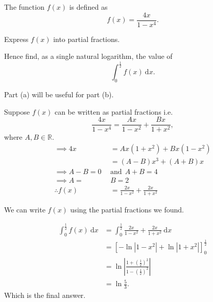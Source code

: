 
\begin{question}
    The function \(f(x) \) is defined as \[ f(x) = \frac{4x}{1 - x^4}. \]

    \begin{questionparts}
        \item Express \(f(x) \) into partial fractions. 
        \item Hence find, as a single natural logarithm, the value of \[ \int_{0}^{\frac{1}{2}} f(x)~ \mathrm{d } x. \]
    \end{questionparts}
    
\end{question}

\begin{solution}
    Part (a) will be useful for part (b). 

    \begin{solutionparts}
        \item Suppose \(f(x) \) can be written as partial fractions i.e. 
        \[ \frac{4x}{1-x^4} = \frac{Ax }{1 -x^2} + \frac{Bx }{1 + x^2},  \] where \(A, B \in \mathbb{R }\). 
        \begin{align*}
            \implies 4x &= Ax(1+x^2) + Bx(1-x^2) \\
            &= (A-B)x^3 + (A+B)x \\
            \implies A - B = 0 ~~&\text{and}~~ A+B = 4 \\
            \implies A = ~&B = 2 \\
            \therefore f(x) &= \frac{2x}{1 - x^2} + \frac{2x}{1 + x^2}
        \end{align*}

        \item We can write \(f(x) \) using the partial fractions we found.
        
        \begin{align*}
            \int_{0}^{\frac{1}{2}} f(x) ~ \mathrm{d} x  &= \int_{0}^{\frac{1}{2}} \frac{2x}{1 - x^2} + \frac{2x}{1 + x^2} ~ \mathrm{d} x \\
            &= \left[ - \ln \left| 1 - x^2 \right| + \ln \left|1 + x^2 \right|\right]_0^\frac{1}{2} \\
            &= \ln \left| \frac{1+ \left(\frac{1}{2}\right)^2}{1 - \left(\frac{1}{2}\right)^2}\right| \\
            &= \ln \frac{5}{3}.
        \end{align*}
        Which is the final answer. 
    \end{solutionparts}
\end{solution}